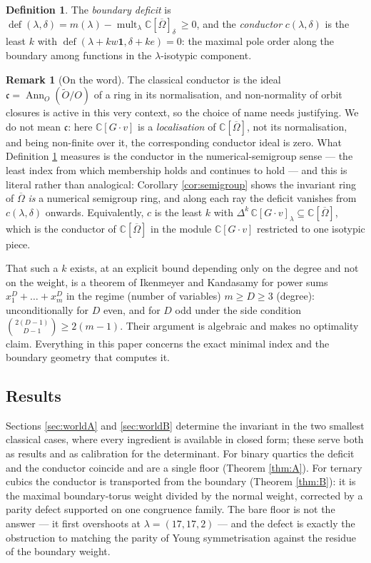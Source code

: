 \documentclass[11pt,reqno]{amsart}
\theoremstyle{plain}
\theoremstyle{definition}
\newtheorem{definition}[theorem]{Definition}
\newtheorem{remark}[theorem]{Remark}
\DeclareMathOperator{\mult}{mult}
\DeclareMathOperator{\dfc}{def}
\newcommand{\cO}{\overline{\Omega}}
\newcommand{\bC}{\mathbb{C}}
\begin{document}
\begin{definition}\label{def:deficit}
The \emph{boundary deficit} is
$\dfc(\lambda,\delta)=m(\lambda)-\mult_\lambda\bC[\cO]_\delta\ \ge 0$,
and the \emph{conductor} $c(\lambda,\delta)$ is the least $k$ with
$\dfc(\lambda+kw\mathbf 1,\delta+ke)=0$: the maximal pole order along the
boundary among functions in the $\lambda$-isotypic component.
\end{definition}

\begin{remark}[On the word]\label{rem:name}
The classical conductor is the ideal $\mathfrak c=\operatorname{Ann}_{O}(\tilde
O/O)$ of a ring in its normalisation, and non-normality of orbit closures is
active in this very context, so the choice of name needs justifying.  We do not
mean $\mathfrak c$: here $\bC[G\cdot v]$ is a \emph{localisation} of
$\bC[\cO]$, not its normalisation, and being non-finite over it, the
corresponding conductor ideal is zero.  What Definition \ref{def:deficit}
measures is the conductor in the numerical-semigroup sense --- the least index
from which membership holds and continues to hold --- and this is literal
rather than analogical: Corollary \ref{cor:semigroup} shows the invariant ring
of $\cO$ \emph{is} a numerical semigroup ring, and along each ray the deficit
vanishes from $c(\lambda,\delta)$ onwards.  Equivalently, $c$ is the least $k$
with $\Delta^{k}\,\bC[G\cdot v]_\lambda\subseteq\bC[\cO]$, which is the
conductor of $\bC[\cO]$ in the module $\bC[G\cdot v]$ restricted to one
isotypic piece.
\end{remark}

That such a $k$ exists, at an explicit bound depending only on the degree and
not on the weight, is a theorem of Ikenmeyer and Kandasamy
\cite[Lem.~5.2]{IK} for power sums $x_1^{D}+\dots+x_m^{D}$ in the regime
(number of variables) $m\ge D\ge3$ (degree): unconditionally for $D$ even, and for
$D$ odd under the side condition $\binom{2(D-1)}{D-1}\ge 2(m-1)$.  Their
argument is algebraic and makes no optimality claim.  Everything in this paper
concerns the exact minimal index and the boundary geometry that computes it.

\subsection*{Results}

Sections \ref{sec:worldA} and \ref{sec:worldB} determine the invariant in the
two smallest classical cases, where every ingredient is available in closed
form; these serve both as results and as calibration for the determinant.  For
binary quartics the deficit and the conductor coincide and are a single floor
(Theorem \ref{thm:A}).  For ternary cubics the conductor is transported from
the boundary (Theorem \ref{thm:B}): it is the maximal boundary-torus weight
divided by the normal weight, corrected by a parity defect supported on one
congruence family.  The bare floor is not the answer --- it first overshoots
at $\lambda=(17,17,2)$ --- and the defect is exactly the obstruction to
matching the parity of Young symmetrisation against the residue of the
boundary weight.
\end{document}
